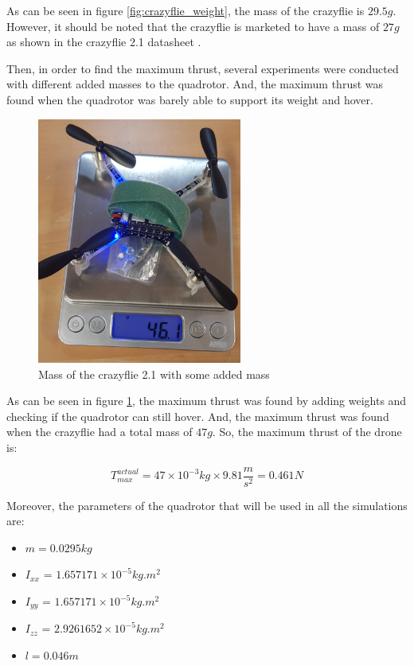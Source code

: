 \documentclass{thesisreport}
\begin{document}
As can be seen in figure \ref{fig:crazyflie_weight}, the mass of the crazyflie is $29.5g$. However, it should be noted that the crazyflie is marketed to have a mass of $27g$ as shown in the crazyflie 2.1 datasheet \cite{crazyflie_datasheet}.

Then, in order to find the maximum thrust, several experiments were conducted with different added masses to the quadrotor. And, the maximum thrust was found when the quadrotor was barely able to support its weight and hover.

\newpage

\begin{figure}[h]
	\centering
	\includegraphics[width=0.6\textwidth, angle =-90]{Images/crazyflie/max_thrust.jpg}
	\caption{Mass of the crazyflie 2.1 with some added mass}
	\label{fig:max_thrust}
\end{figure}

As can be seen in figure \ref{fig:max_thrust}, the maximum thrust was found by adding weights and checking if the quadrotor can still hover. And, the maximum thrust was found when the crazyflie had a total mass of $47g$. So, the maximum thrust of the drone is:

\begin{equation}
	T_{max}^{actual} = 47 \times 10^{-3} kg \times 9.81 \frac{m}{s^2} = 0.461 N
\end{equation}

Moreover, the parameters of the quadrotor that will be used in all the simulations are:

\begin{itemize}
	\item $m = 0.0295 kg$
	\item $I_{xx}$ = $1.657171 \times 10^{-5}  kg.m^2$
	\item $I_{yy}$ = $1.657171 \times 10^{-5}  kg.m^2$
	\item $I_{zz}$ = $2.9261652 \times 10^{-5} kg.m^2$
	\item $l = 0.046m$
	
\end{itemize}
\end{document}
